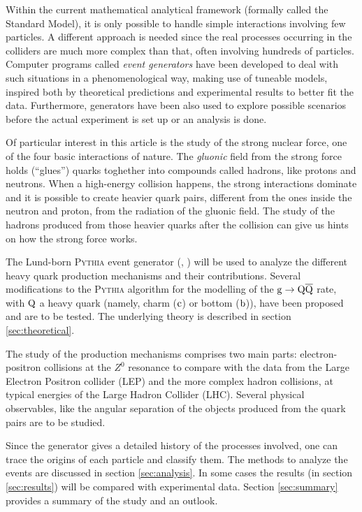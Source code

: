 \documentclass[a4paper,12pt]{article}
\begin{document}
Within the current mathematical analytical framework (formally called the Standard Model), it is only possible to handle simple interactions involving few particles. A different approach is needed since the real processes occurring in the colliders are much more complex than that, often involving hundreds of particles. Computer programs called \textit{event generators} have been developed to deal with such situations in a phenomenological way, making use of tuneable models, inspired both by theoretical predictions and experimental results to better fit the data. Furthermore, generators have been also used to explore possible scenarios before the actual experiment is set up or an analysis is done.

Of particular interest in this article is the study of the strong nuclear force, one of the four basic interactions of nature. The \textit{gluonic} field from the strong force holds (``glues'') quarks toghether into compounds called hadrons, like protons and neutrons. When a high-energy collision happens, the strong interactions dominate and it is possible to create heavier quark pairs, different from the ones inside the neutron and proton, from the radiation of the gluonic field. The study of the hadrons produced from those heavier quarks after the collision can give us hints on how the strong force works.

The Lund-born \textsc{Pythia} event generator (\cite{Sjostrand:2006za}, \cite{Sjostrand:2007gs}) will be used to analyze the different heavy quark production mechanisms and their contributions. Several modifications to the \textsc{Pythia} algorithm for the modelling of the ${\mathrm g}\to {\mathrm Q}\overline{\mathrm Q}$ rate, with ${\mathrm Q}$ a heavy quark (namely, charm (${\mathrm c}$) or bottom (${\mathrm b}$)), have been proposed and are to be tested. The underlying theory is described in section \ref{sec:theoretical}.

The study of the production mechanisms comprises two main parts: electron-positron collisions at the $Z^0$ resonance to compare with the data from the Large Electron Positron collider (LEP) and the more complex hadron collisions, at typical energies of the Large Hadron Collider (LHC). Several physical observables, like the angular separation of the objects produced from the quark pairs are to be studied.

Since the generator gives a detailed history of the processes involved, one can trace the origins of each particle and classify them. The methods to analyze the events are discussed in section \ref{sec:analysis}. In some cases the results (in section \ref{sec:results}) will be compared with experimental data. Section \ref{sec:summary} provides a summary of the study and an outlook.
\end{document}
